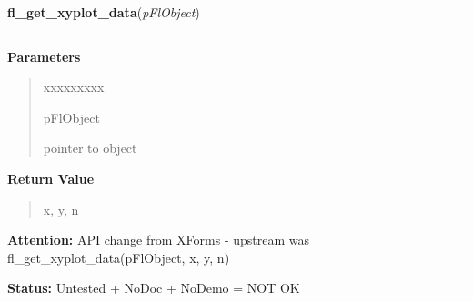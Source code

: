 \hspace{.8\funcindent}\begin{boxedminipage}{\funcwidth}

    \raggedright \textbf{fl\_get\_xyplot\_data}(\textit{pFlObject})

    \vspace{-1.5ex}

    \rule{\textwidth}{0.5\fboxrule}
\setlength{\parskip}{2ex}
\setlength{\parskip}{1ex}
      \textbf{Parameters}
      \vspace{-1ex}

      \begin{quote}
        \begin{Ventry}{xxxxxxxxx}

          \item[pFlObject]

          pointer to object

        \end{Ventry}

      \end{quote}

      \textbf{Return Value}
    \vspace{-1ex}

      \begin{quote}
      x, y, n

      \end{quote}

\textbf{Attention:} API change from XForms - upstream was fl\_get\_xyplot\_data(pFlObject, x, 
y, n)



\textbf{Status:} Untested + NoDoc + NoDemo = NOT OK



    \end{boxedminipage}

    \label{xformslib:flxyplot:fl_get_xyplot_data_pointer}

    \vspace{0.5ex}

